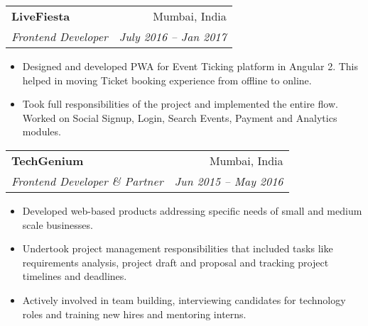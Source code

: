 \documentclass[letterpaper,11pt]{article}
\makeatletter
\newcommand{\resumeItem}[2]{
	\item\normalsize{
		\textbf{#1}{: #2}
	}\vspace{-2pt}
}
\newcommand{\resumeSubheading}[4]{
	\vspace{-2pt}\item
	\begin{tabular*}{0.97\textwidth}[t]{l@{\extracolsep{\fill}}r}
		\textbf{#1} & #2 \\
		\textit{\small#3} & \textit{\small #4} \\
	\end{tabular*}\vspace{-8pt}
}
\newcommand{\resumeSubHeadingListStart}{\begin{itemize}[leftmargin=*]}
\newcommand{\resumeSubHeadingListEnd}{\end{itemize}}
\newcommand{\resumeItemListStart}{\begin{itemize}}
\makeatother
\begin{document}
	\resumeSubheading
	{LiveFiesta}{Mumbai, India}
	{Frontend Developer}{July 2016 -- Jan 2017}
	\resumeItemListStart
	\item
	{Designed and developed PWA for Event Ticking platform in Angular 2. This helped in moving Ticket booking experience from offline to online.} %
	\item
	{Took full responsibilities of the project and implemented the entire flow. Worked on Social Signup, Login, Search Events, Payment and Analytics modules.} %
	\vspace{-2mm}
	\resumeSubHeadingListEnd
	
	\resumeSubheading
	{TechGenium}{Mumbai, India}
	{Frontend Developer \& Partner}{Jun 2015 -- May 2016}
	\resumeItemListStart
	\item
	{Developed web-based products addressing specific needs of small and medium scale businesses.}
	\item
	{Undertook project management responsibilities that included tasks like requirements analysis, project draft and proposal and tracking project timelines and deadlines.}
	\item
	{Actively involved in team building, interviewing candidates for technology roles and training new hires and mentoring interns.}

	\resumeSubHeadingListEnd
	
	
\end{document}
